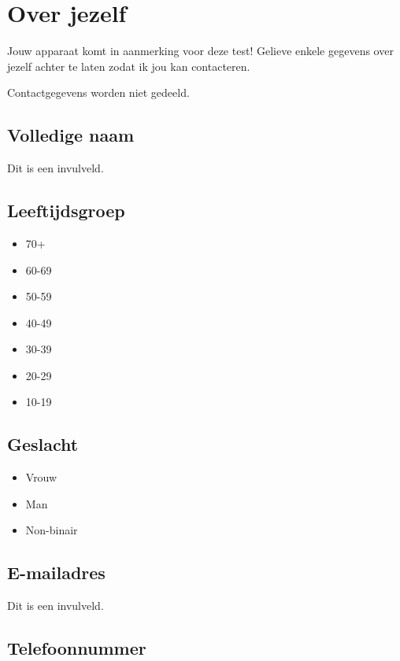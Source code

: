 \section{Over jezelf}

Jouw apparaat komt in aanmerking voor deze test! Gelieve enkele gegevens over jezelf achter te laten zodat ik jou kan contacteren.

Contactgegevens worden niet gedeeld.

\subsection*{Volledige naam}

Dit is een invulveld.

\subsection*{Leeftijdsgroep}

\begin{itemize}
    \item 70+
    \item 60-69
    \item 50-59
    \item 40-49
    \item 30-39
    \item 20-29
    \item 10-19
\end{itemize}

\subsection*{Geslacht}

\begin{itemize}
    \item Vrouw
    \item Man
    \item Non-binair
\end{itemize}

\subsection*{E-mailadres}

Dit is een invulveld.

\subsection*{Telefoonnummer}

